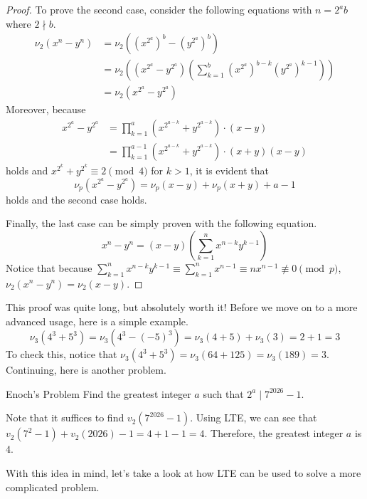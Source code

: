 \documentclass[../../../main.tex]{subfiles}
\begin{document}
\begin{proof}
To prove the second case, consider the following equations with
$n = 2^a b$ where $2 \nmid b$.
\begin{align*}
    \nu_2 \left( x^n - y^n \right)
    &= \nu_2 \left(
        \left( x^{2^a} \right)^b - \left( y^{2^a} \right)^b
    \right) \\
    &= \nu_2 \left(
        \left( x^{2^a} - y^{2^a} \right) \left(
            \sum_{k=1}^b
                \left( x^{2^a} \right)^{b-k}
                \left( y^{2^a} \right)^{k-1}
        \right)
    \right) \\
    &= \nu_2 \left( x^{2^a} - y^{2^a} \right)
\end{align*}
Moreover, because
\begin{align*}
    x^{2^a} - y^{2^a}
    &= \prod_{k=1}^a \left( x^{2^{a-k}} + y^{2^{a-k}} \right)
        \cdot (x - y) \\
    &= \prod_{k=1}^{a-1} \left( x^{2^{a-k}} + y^{2^{a-k}} \right)
        \cdot (x + y) (x - y)
\end{align*}
holds and $x^{2^k} + y^{2^k} \equiv 2 \pmod{4}$ for $k > 1$,
it is evident that
\[
\nu_p \left( x^{2^a} - y^{2^a} \right)
= \nu_p (x - y) + \nu_p (x + y) + a - 1
\]
holds and the second case holds.

Finally, the last case can be simply proven with the following
equation.
\[
x^n - y^n
= (x - y) \left( \sum_{k=1}^n x^{n-k} y^{k-1} \right)
\]
Notice that because $\sum_{k=1}^n x^{n-k} y^{k-1} \equiv
\sum_{k=1}^n x^{n-1} \equiv n x^{n-1} \not\equiv 0 \pmod{p}$,
$\nu_2 (x^n - y^n) = \nu_2 (x - y)$.
\end{proof}

This proof was quite long, but absolutely worth it! Before we
move on to a more advanced usage, here is a simple example.
\[
\nu_3 \left( 4^3 + 5^3 \right)
= \nu_3 \left( 4^3 - (-5)^3 \right)
= \nu_3 (4 + 5) + \nu_3 (3)
= 2 + 1
= 3
\]
To check this, notice that $\nu_3 (4^3 + 5^3) = \nu_3 (64 + 125)
= \nu_3 (189) = 3$. Continuing, here is another problem.

\begin{problem}{Enoch's Problem}{}
Find the greatest integer $a$ such that $2^a \mid 7^{2026} - 1$.
\end{problem}
\begin{solution}
Note that it suffices to find $v_2 (7^{2026} - 1)$. Using LTE,
we can see that $v_2 (7^2 - 1) + v_2 (2026) - 1 = 4 + 1 - 1 = 4$.
Therefore, the greatest integer $a$ is $4$.
\end{solution}

With this idea in mind, let's take a look at how LTE can be used
to solve a more complicated problem.
\end{document}
